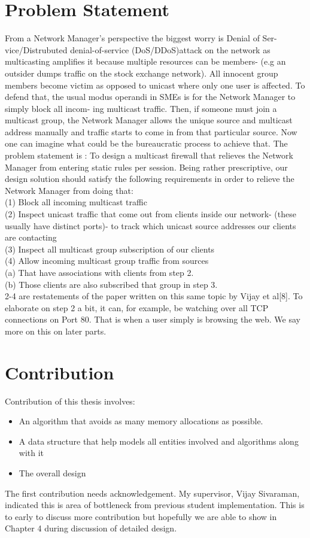 \documentclass[11pt,left=2cm,bottom=2cm,oneside]{book}
\begin{document}
\section{Problem Statement}
From a Network Manager's perspective the biggest worry is Denial of Ser-
vice/Distrubuted denial-of-service (DoS/DDoS)attack on the network as
multicasting amplifies it because multiple resources can be members- (e.g an outsider dumps
traffic on the stock exchange network). All innocent group members become
victim
as opposed to unicast where only one user is affected. To defend that, the
usual
modus operandi in SMEs is for the Network Manager to simply block all incom-
ing multicast traffic. Then, if someone must join a multicast group, the
Network
Manager allows the unique source and multicast address manually and traffic
starts
to come in from that particular source. Now one can imagine what could be the
bureaucratic process to achieve that.
The problem statement is : To design a multicast firewall that relieves the
Network Manager from entering static rules per session.
Being rather prescriptive, our design solution should satisfy the following
requirements in order to relieve the Network Manager from doing that:\\
(1) Block all incoming multicast traffic\\
(2) Inspect unicast traffic that come out from clients inside our network-
(these usually have distinct ports)- to track which unicast source addresses
our clients are contacting\\
(3) Inspect all multicast group subscription of our clients\\
(4) Allow incoming multicast group traffic from sources\\
(a) That have associations with clients from step 2.\\
(b) Those clients are also subscribed that group in step 3.\\
2-4 are restatements of the paper written on this same topic by Vijay et
al[8]. To elaborate on step 2 a bit, it can, for example, be watching over all TCP connections
on Port 80. That is when a user simply is  browsing the web. We say more on
this
on later parts.
\section{Contribution}
Contribution of this thesis involves:
\begin{itemize}
\item An algorithm that avoids as many memory allocations as possible.
\item A data structure that help models all entities involved and algorithms
along with it
\item The overall design
\end{itemize}
The first contribution needs acknowledgement. My supervisor, Vijay Sivaraman,
indicated this is area of bottleneck from previous student implementation.
This is
to early to discuss more contribution but hopefully we are able to show in
Chapter
4 during discussion of detailed design.
\end{document}
